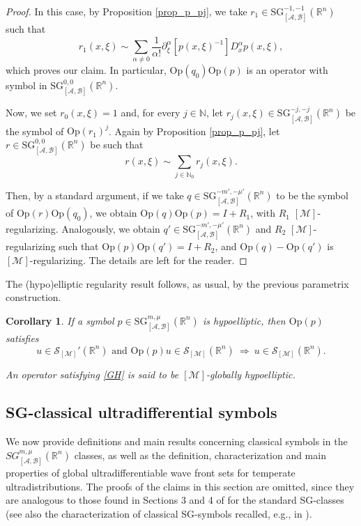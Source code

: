 \documentclass[11pt,reqno]{amsart}
\numberwithin{equation}{section}
\newtheorem{corollary}[theorem]{Corollary}
\newcommand{\R}{{\mathbb{R}}} %
\newcommand{\N}{{\mathbb{N}}} %
\newcommand{\caS}{{\mathcal{S}}}
\newcommand{\Op}{{\mathrm{Op}}}
\newcommand{\SG}{{\mathrm{SG}}}
\newcommand{\M}{{\mathcal{M}}} %
\newcommand{\A}{{\mathcal{A}}} %
\newcommand{\B}{{\mathcal{B}}} %
\begin{document}
\begin{proof}
	In this case, by Proposition \ref{prop_p_pj}, we take $r_1\in {\SG}_{[\A,\B]}^{-1,-1}(\R^n)$ such that
	\[r_1(x,\xi) \sim \sum_{\alpha\neq 0}\frac{1}{\alpha!}\partial_\xi^\alpha [p(x,\xi)^{-1}] D_x^\alpha p(x,\xi),\]
	which proves our claim. In particular, $\Op(q_0)\Op(p)$ is an operator with symbol in ${\SG}_{[\A,\B]}^{0,0}(\R^n)$.
	
	Now, we set $r_0(x,\xi)=1$ and, for every $j\in\N$, let $r_j(x,\xi)\in {\SG}_{[\A,\B]}^{-j,-j}(\R^n)$ be the symbol of $\Op(r_1)^j$. 
	Again by Proposition \ref{prop_p_pj}, let $r\in {\SG}_{[\A,\B]}^{0,0}(\R^n)$ be such that
	\[r(x,\xi) \sim \sum_{j\in\N_0}r_j(x,\xi).\]
	
	Then, by a standard argument,
	if we take $q\in {\SG}_{[\A,\B]}^{-m',-\mu'}(\R^n)$ to be the symbol of $\Op(r)\Op(q_0)$, we obtain $\Op(q)\Op(p)=I+R_1$, with $R_1$ $[\M]$-regularizing. 
	Analogously, we obtain $q'\in {\SG}_{[\A,\B]}^{-m',-\mu'}(\R^n)$ and $R_2$ $[\M]$-regularizing such that $\Op(p)\Op(q')=I+R_2$,
	and $\Op(q)-\Op(q')$ is $[\M]$-regularizing. The details are left for the reader.
\end{proof}

The (hypo)elliptic regularity result follows, as usual, by the previous parametrix construction.

\begin{corollary}
	If a symbol $p\in {\SG}_{[\A,\B]}^{m,\mu}(\R^n)$ is hypoelliptic, then $\Op(p)$ satisfies
	\begin{equation}\label{GH}
		u\in\caS_{[\M]}'(\R^n) \text{ and } \Op(p)u\in \caS_{[\M]}(\R^n)\ \Rightarrow\ u\in\caS_{[\M]}(\R^n).
	\end{equation}
	
	An operator satisfying \eqref{GH} is said to be $[\M]$-globally hypoelliptic.
\end{corollary}
%




\subsection{SG-classical ultradifferential symbols}\label{sec:sgucl}
We now provide definitions and main results concerning classical symbols in the $SG_{[\A,\B]}^{m,\mu}(\R^n)$ classes, as well as the definition, characterization and main properties of global ultradifferentiable wave front sets for temperate ultradistributions. The proofs of the claims in this section are omitted, since they are analogous to those found in Sections 3 and 4 of \cite{CapRod2006} for the standard SG-classes
(see also the characterization of classical SG-symbols
recalled, e.g., in \cite{EgSchu97}).
\end{document}
